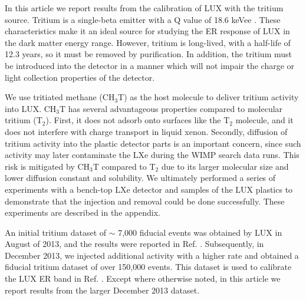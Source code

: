 In this article we report results from the calibration of LUX with the tritium source. Tritium is a single-beta emitter with a Q value of 18.6 keVee \cite{Tritium_Q}.  These characteristics make it an ideal source for studying the ER response of LUX in the dark matter energy range. However, tritium is long-lived, with a half-life of 12.3 years\cite{Tritium_halflife_all}, so it must be removed by purification. In addition, the tritium must be introduced into the detector in a manner which will not impair the charge or light collection properties of the detector. 

We use tritiated methane (CH$_3$T) as the host molecule to deliver tritium activity into LUX. CH$_3$T has several advantageous properties compared to molecular tritium (T$_2$). First, it does not adsorb onto surfaces like the T$_2$ molecule, and it does not interfere with charge transport in liquid xenon. Secondly, diffusion of tritium activity into the plastic detector parts is an important concern, since such activity may later contaminate the LXe during the WIMP search data runs.  This risk is mitigated by CH$_3$T compared to T$_2$ due to its larger molecular size and lower diffusion constant and solubility. We ultimately performed a series of experiments with a bench-top LXe detector and samples of the LUX plastics to demonstrate that the injection and removal could be done successfully. These experiments are described in the appendix.

An initial tritium dataset of $\sim$ 7,000 fiducial events was obtained by LUX in August of 2013, and the results were reported in Ref. \cite{lux-results}. Subsequently, in December 2013, we injected additional activity with a higher rate and obtained a fiducial tritium dataset of over 150,000 events. This dataset is used to calibrate the LUX ER band in Ref. \cite{lux-reanalysis}. Except where otherwise noted, in this article we report results from the larger December 2013 dataset.